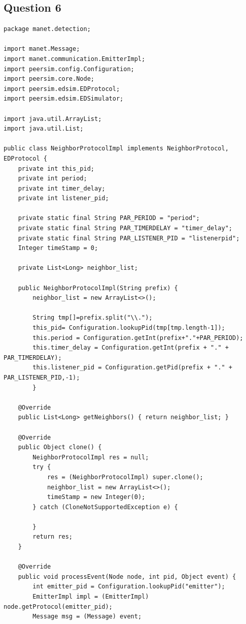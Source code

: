 \documentclass[a4paper]{article}
\begin{document}
\pagebreak

\subsection{Question 6}


\begin{verbatim}
package manet.detection;

import manet.Message;
import manet.communication.EmitterImpl;
import peersim.config.Configuration;
import peersim.core.Node;
import peersim.edsim.EDProtocol;
import peersim.edsim.EDSimulator;

import java.util.ArrayList;
import java.util.List;

public class NeighborProtocolImpl implements NeighborProtocol, EDProtocol {
    private int this_pid;
    private int period;
    private int timer_delay;
    private int listener_pid;

    private static final String PAR_PERIOD = "period";
    private static final String PAR_TIMERDELAY = "timer_delay";
    private static final String PAR_LISTENER_PID = "listenerpid";
    Integer timeStamp = 0;

    private List<Long> neighbor_list;

    public NeighborProtocolImpl(String prefix) {
        neighbor_list = new ArrayList<>();

        String tmp[]=prefix.split("\\.");
        this_pid= Configuration.lookupPid(tmp[tmp.length-1]);
        this.period = Configuration.getInt(prefix+"."+PAR_PERIOD);
        this.timer_delay = Configuration.getInt(prefix + "." + PAR_TIMERDELAY);
        this.listener_pid = Configuration.getPid(prefix + "." + PAR_LISTENER_PID,-1);
        }

    @Override
    public List<Long> getNeighbors() { return neighbor_list; }

    @Override
    public Object clone() {
        NeighborProtocolImpl res = null;
        try {
            res = (NeighborProtocolImpl) super.clone();
            neighbor_list = new ArrayList<>();
            timeStamp = new Integer(0);
        } catch (CloneNotSupportedException e) {

        }
        return res;
    }

    @Override
    public void processEvent(Node node, int pid, Object event) {
        int emitter_pid = Configuration.lookupPid("emitter");
        EmitterImpl impl = (EmitterImpl) node.getProtocol(emitter_pid);
        Message msg = (Message) event;


\end{verbatim}
\end{document}
